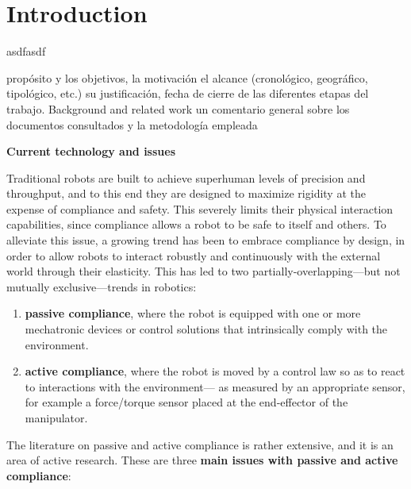 \chapter{Introduction}
\label{introchap}

asdfasdf

propósito y los objetivos, la motivación
el alcance (cronológico, geográfico, tipológico, etc.) su justificación,
fecha de cierre de las diferentes etapas del trabajo.
Background and related work
un comentario general sobre los documentos consultados y la metodología empleada

\textbf{Current technology and issues}

Traditional robots are built to achieve superhuman levels of precision and throughput, and to this end they
are designed to maximize rigidity at the expense of compliance and safety. This severely limits their physical
interaction capabilities, since compliance allows a robot to be safe to itself and others.
To alleviate this issue, a growing trend has been to embrace compliance by design, in order to allow robots to interact robustly and continuously with the external world through their elasticity. This has led to two partially-overlapping—but
not mutually exclusive—trends in robotics:

\begin{enumerate}
    \item{\textbf{passive compliance}}, where the robot is equipped with one or
more mechatronic devices or control solutions that intrinsically comply with the environment.
    \item{\textbf{active
compliance}}, where the robot is moved by a control law so as to react to interactions with the environment—
as measured by an appropriate sensor, for example a force/torque sensor placed at the end-effector of the
manipulator.
\end{enumerate}

The literature on passive and active compliance is rather extensive, and it is an area of active
research. These are three \textbf{main issues with passive and active compliance}:

